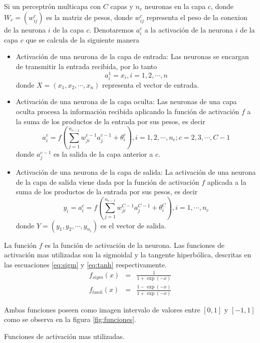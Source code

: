 Si un perceptrón multicapa con $C$ capas y $n_c$ neuronas en la capa $c$, donde $W_c = (w^{c}_{ij})$ es la matriz de pesos, donde $w^{c}_{ij}$ representa el peso de la conexion de la neurona $i$ de la capa $c$. Denotaremos $a^{c}_{i}$ a la activación de la neurona $i$ de la capa $c$ que se calcula de la siguiente manera
\begin{itemize}
	\item Activación de una neurona de la capa de entrada: Las neuronas se encargan de transmitir la entrada recibida, por lo tanto $$ a^{1}_{i} = x_{i}, i = 1, 2, \cdots, n$$ donde $X = (x_1, x_2, \cdots, x_n)$ representa el vector de entrada.

	\item Activación de una neurona de la capa oculta: Las neuronas de una capa oculta procesa la información recibida aplicando la función de activación $f$ a la suma de los productos de la entrada por sus pesos, es decir $$ a^{c}_{i} = f\left(\sum^{n_{c - 1}}_{j=1} w^{c - 1}_{ji}a^{c - 1}_{j} + \theta^{c}_{i}\right), i = 1, 2, \cdots, n_c; c = 2, 3, \cdots, C - 1$$ donde $a^{c - 1}_{j}$ es la salida de la capa anterior a $c$.

	\item Activación de una neurona de la capa de salida: La activación de una neurona de la capa de salida viene dada por la función de activación $f$ aplicada a la suma de los productos de la entrada por sus pesos, es decir $$ y_{i} = a^{c}_{i} = f\left(\sum^{n_{c - 1}}_{j=1} w^{C - 1}_{ji}a^{C - 1}_{j} + \theta^{C}_{i}\right), i = 1, \cdots, n_c$$ donde $Y = (y_1, y_2, \cdots, y_{n_{c}})$ es el vector de salida.
\end{itemize}

La función $f$ es la función de activación de la neurona. Las funciones de activación mas utilizadas son la sigmoidal y la tangente hiperbólica, descritas en las escuaciones \ref{eq:sigm} y \ref{eq:tanh} respectivamente.
\begin{eqnarray}
	f_{sigm}(x) &=& \frac{1}{1+\exp(-x)}\label{eq:sigm}\\
	f_{tanh}(x) &=& \frac{1 - \exp(-x)}{1 + \exp(-x)}\label{eq:tanh}
\end{eqnarray}

Ambas funciones poseen como imagen intervalo de valores entre $[0, 1]$ y $[-1, 1]$ como se observa en la figura \ref{fig:funciones}.%

\begin{imagen}
	\scalebox{1.0}{}
	\caption{Funciones de activación mas utilizadas.}
	\label{fig:funciones}
\end{imagen}





